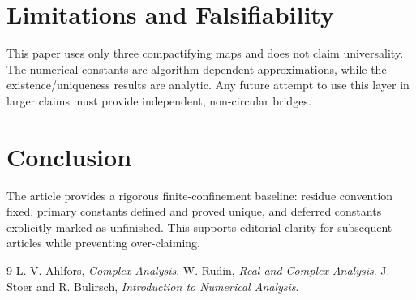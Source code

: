 \documentclass[11pt]{article}
\theoremstyle{definition}
\theoremstyle{plain}
\begin{document}
\section{Limitations and Falsifiability}
This paper uses only three compactifying maps and does not claim universality.
The numerical constants are algorithm-dependent approximations, while the existence/uniqueness results are analytic.
Any future attempt to use this layer in larger claims must provide independent, non-circular bridges.

\section{Conclusion}
The article provides a rigorous finite-confinement baseline:
residue convention fixed, primary constants defined and proved unique,
and deferred constants explicitly marked as unfinished.
This supports editorial clarity for subsequent articles while preventing over-claiming.


\begin{thebibliography}{9}
 L. V. Ahlfors, \emph{Complex Analysis}.
 W. Rudin, \emph{Real and Complex Analysis}.
 J. Stoer and R. Bulirsch, \emph{Introduction to Numerical Analysis}.
\end{thebibliography}
\end{document}
